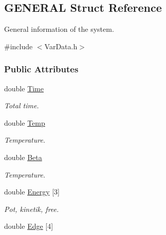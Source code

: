 \hypertarget{structGENERAL}{}\subsection{G\+E\+N\+E\+R\+AL Struct Reference}
\label{structGENERAL}


General information of the system.  




{\ttfamily \#include $<$Var\+Data.\+h$>$}

\subsubsection*{Public Attributes}
\begin{DoxyCompactItemize}
\item 
double \hyperlink{structGENERAL_af51ff88ae9c6c4b9907f516c09ebf68f}{Time}\hypertarget{structGENERAL_af51ff88ae9c6c4b9907f516c09ebf68f}{}\label{structGENERAL_af51ff88ae9c6c4b9907f516c09ebf68f}

\begin{DoxyCompactList}\small\item\em Total time. \end{DoxyCompactList}\item 
double \hyperlink{structGENERAL_a30b2ceb495b99ab029b438563e5f22fa}{Temp}\hypertarget{structGENERAL_a30b2ceb495b99ab029b438563e5f22fa}{}\label{structGENERAL_a30b2ceb495b99ab029b438563e5f22fa}

\begin{DoxyCompactList}\small\item\em Temperature. \end{DoxyCompactList}\item 
double \hyperlink{structGENERAL_aded0b530ca9ce830881a607b109e709f}{Beta}\hypertarget{structGENERAL_aded0b530ca9ce830881a607b109e709f}{}\label{structGENERAL_aded0b530ca9ce830881a607b109e709f}

\begin{DoxyCompactList}\small\item\em Temperature. \end{DoxyCompactList}\item 
double \hyperlink{structGENERAL_ae35f6a776d95c5f300f4c70e2fc9bb48}{Energy} \mbox{[}3\mbox{]}\hypertarget{structGENERAL_ae35f6a776d95c5f300f4c70e2fc9bb48}{}\label{structGENERAL_ae35f6a776d95c5f300f4c70e2fc9bb48}

\begin{DoxyCompactList}\small\item\em Pot, kinetik, free. \end{DoxyCompactList}\item 
double \hyperlink{structGENERAL_a507c812f21f55c46378bfc7c30d0bc75}{Edge} \mbox{[}4\mbox{]}\hypertarget{structGENERAL_a507c812f21f55c46378bfc7c30d0bc75}{}\label{structGENERAL_a507c812f21f55c46378bfc7c30d0bc75}


\end{DoxyCompactItemize}
